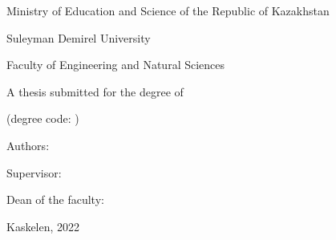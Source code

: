 \newpage
\pagestyle{empty}

\begin{center}
\large
Ministry of Education and Science of the Republic of Kazakhstan

Suleyman Demirel University

Faculty of Engineering and Natural Sciences

\vspace{2cm}
\textbf{\mytitle}

\vspace{1cm}
\large
A thesis submitted for the degree of

\mydegree

(degree code: \mydegreecode)

\vspace{2cm}
Authors: \textbf{\myauthor}

\vspace{2cm}
Supervisor: \textbf{\mycoach}

\vspace{2cm}
Dean of the faculty:
\textbf{\mydean}


\vfill
Kaskelen, 2022
\end{center}